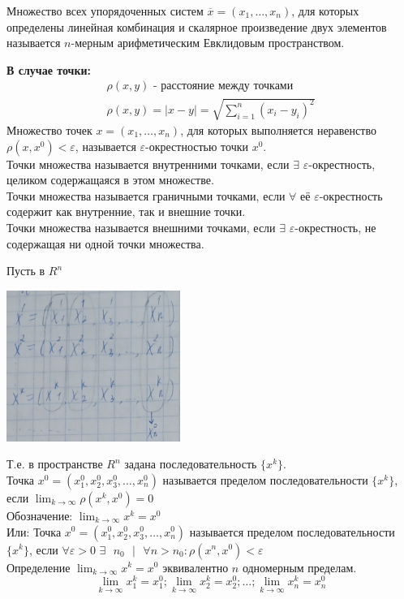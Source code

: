 \documentclass[12pt]{article}
\begin{document}
    Множество всех упорядоченных систем $\overline{x} = (x_1, \dots, x_n)$, для которых определены линейная комбинация и скалярное произведение двух элементов называется $n$-мерным арифметическим Евклидовым пространством.\par\noindent
    \textbf{В случае точки:}
    \begin{gather*}
        \rho (x,y) \text{ - расстояние между точками}\\
        \rho (x,y) = |x - y| = \sqrt{ \sum_{i = 1}^{n} (x_i - y_i)^2 }
    \end{gather*}
    Множество точек $x = (x_1, \dots, x_n)$, для которых выполняется неравенство $\rho (x, x^0) < \varepsilon$, называется $\varepsilon$-окрестностью точки $x^0$.\\
    Точки множества называется внутренними точками, если $\exists$ $\varepsilon$-окрестность, целиком содержащаяся в этом множестве.\\
    Точки множества называется граничными точками, если $\forall$ её $\varepsilon$-окрестность содержит как внутренние, так и внешние точки.\\
    Точки множества называется внешними точками, если $\exists$ $\varepsilon$-окрестность, не содержащая ни одной точки множества.\par\noindent
    Пусть в $R^n$
    \begin{center}
        \includegraphics{7.1.2.png}
    \end{center}
    Т.е. в пространстве $R^n$ задана последовательность $\{x^k\}$.\\
    Точка $x^0 = (x^0_1, x^0_2, x^0_3, \dots, x^0_n)$ называется пределом последовательности $\{x^k\}$, если $\lim_{k\to\infty} \rho(x^k, x^0) = 0$\\
    Обозначение: $\lim_{k\to\infty}x^k=x^0$\\
    Или: Точка $x^0 = (x^0_1, x^0_2, x^0_3, \dots, x^0_n)$ называется пределом последовательности $\{x^k\}$, если $\forall \varepsilon > 0$ $\exists \text{ } n_0 \text{ } \big| \text{ } \forall n > n_0 : \rho(x^n, x^0) < \varepsilon$\\
    Определение $\lim_{k\to\infty}x^k=x^0$ эквивалентно $n$ одномерным пределам.
    \[ \lim_{k\to\infty}x^k_1 = x^0_1; \lim_{k\to\infty}x^k_2 = x^0_2; \dots; \lim_{k\to\infty}x^k_n = x^0_n \]
\end{document}
